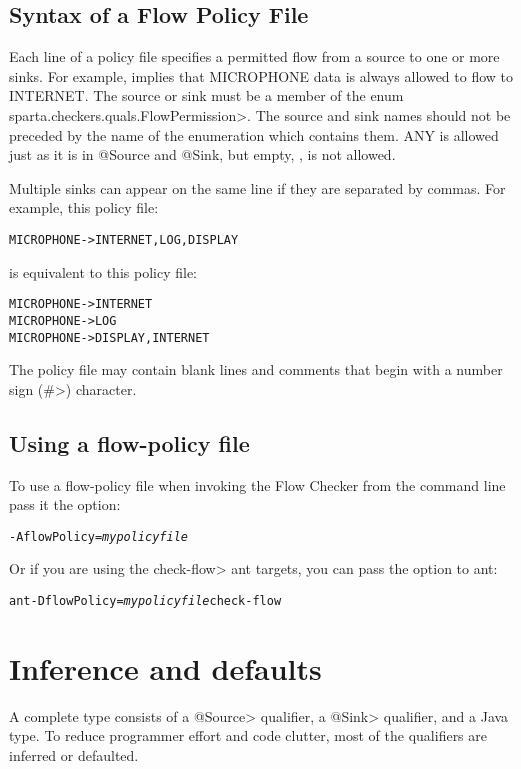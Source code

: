 \subsection{Syntax of a Flow Policy File}

Each line of a policy file specifies a permitted flow from a source to one
or more sinks.  For example,
 implies that
MICROPHONE data is always allowed to flow to INTERNET.
The source or sink must be a member of the enum
\<sparta.checkers.quals.FlowPermission>.  The source 
and sink names should not be preceded by the name of the enumeration which contains them.
ANY is allowed just as it is in @Source and @Sink, but empty, \ttcbs, is not allowed.

Multiple sinks can appear on the same line if they are separated by commas. 
For example,
this policy file:
\begin{alltt}
   MICROPHONE -> INTERNET, LOG, DISPLAY
\end{alltt}
is equivalent to this policy file:
\begin{alltt}
   MICROPHONE -> INTERNET
   MICROPHONE -> LOG
   MICROPHONE -> DISPLAY, INTERNET
\end{alltt}

The policy file may contain blank lines and comments that begin with 
a number sign (\<\#>) character.



\subsection{Using a flow-policy file}
To use a flow-policy file when invoking the Flow Checker from the
command line pass it the option:
\begin{alltt}
-AflowPolicy=\emph{mypolicyfile}
\end{alltt}

Or if you are using the \<check-flow> ant targets, you can pass the option to ant:
\begin{alltt}
ant -DflowPolicy=\emph{mypolicyfile} check-flow
\end{alltt}

 \section{Inference and defaults}
 \label{sec:system:defaults}
 
 A complete type consists of a \<@Source> qualifier, a \<@Sink> qualifier,
 and a Java type.  To reduce programmer effort and code clutter, most of the
 qualifiers are inferred or defaulted.  
 
